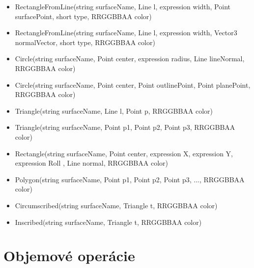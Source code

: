 \begin{itemize}

	\item RectangleFromLine(string surfaceName, Line l, expression width, Point surfacePoint, short type, RRGGBBAA color)
	
	\item RectangleFromLine(string surfaceName, Line l, expression width, Vector3 normalVector, short type, RRGGBBAA color)

	\item Circle(string surfaceName, Point center, expression radius, Line lineNormal, RRGGBBAA color)
	
	\item Circle(string surfaceName, Point center, Point outlinePoint, Point planePoint, RRGGBBAA color)

	\item Triangle(string surfaceName, Line l, Point p, RRGGBBAA color)
	
	\item Triangle(string surfaceName, Point p1, Point p2, Point p3, RRGGBBAA color)


	\item Rectangle(string surfaceName, Point center, expression X, expression Y, expression Roll
    , Line normal, RRGGBBAA color)

	\item Polygon(string surfaceName, Point p1, Point p2, Point p3, ..., RRGGBBAA color)


	\item Circumscribed(string surfaceName, Triangle t, RRGGBBAA color) 
	
	\item Inscribed(string surfaceName, Triangle t, RRGGBBAA color)		
	
\end{itemize}
\section*{Objemové operácie}


